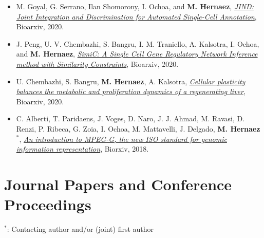 \documentclass[11pt,a4paper,sans]{moderncv}        %
\begin{document}
\begin{itemize}

\item M. Goyal, G. Serrano, Ilan Shomorony,  I. Ochoa, and  \textbf{M. Hernaez}, \href{https://doi.org/10.1101/2020.10.06.327601}{\textsl{JIND: Joint Integration and Discrimination for Automated Single-Cell Annotation}}, Bioarxiv, 2020.\\

\item J. Peng, U. V. Chembazhi, S. Bangru, I. M. Traniello, A. Kalsotra, I. Ochoa, and  \textbf{M. Hernaez}, \href{https://www.biorxiv.org/content/10.1101/2020.04.03.023002v1}{\textsl{SimiC: A Single Cell Gene Regulatory Network Inference method with Similarity Constraints}}, Bioarxiv, 2020.\\

\item U. Chembazhi, S. Bangru, \textbf{M. Hernaez}, A. Kalsotra, \href{https://www.biorxiv.org/content/10.1101/2020.05.29.124263v1}{\textsl{Cellular plasticity balances the metabolic and proliferation dynamics of a regenerating liver}}, Bioarxiv, 2020.\\

\item C. Alberti, T. Paridaens, J. Voges, D. Naro, J. J. Ahmad, M. Ravasi, D. Renzi, P. Ribeca, G. Zoia, I. Ochoa, M. Mattavelli, J. Delgado,  \textbf{M. Hernaez}$^\ast$, \href{https://www.biorxiv.org/content/early/2018/10/08/426353}{\textsl{An introduction to MPEG-G, the new ISO standard for genomic information representation}}, Biorxiv, 2018.\\



\end{itemize}

\section{Journal Papers and Conference Proceedings }
$^{\ast}$: Contacting author and/or (joint) first author\\
\end{document}
